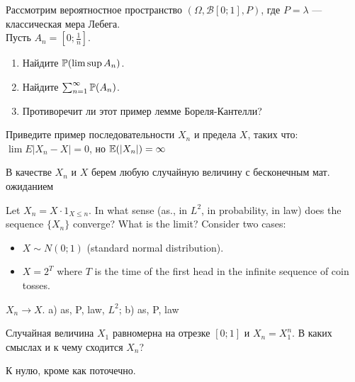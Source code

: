 \begin{problem}
Рассмотрим вероятностное пространство
$(\Omega,\mathcal{B}[0;1],P)$, где $P=\lambda$ — классическая
мера Лебега.\\
Пусть $A_{n}=[0;\frac{1}{n}]$.
\begin{enumerate}
\item Найдите $\P(\limsup A_{n})$.
\item Найдите $\sum_{n=1}^{\infty}\P(A_{n})$.
\item Противоречит ли этот пример лемме Бореля-Кантелли?
\end{enumerate}

\begin{sol}

\end{sol}
\end{problem}

\begin{problem}
Приведите пример последовательности $X_{n}$ и предела $X$, таких что: $\lim E|X_{n}-X|=0$, но $\E(|X_{n}|)=\infty$

\begin{sol}
 В качестве $X_{n}$ и $ X $ берем любую случайную величину с бесконечным мат. ожиданием
\end{sol}
\end{problem}

\begin{problem}
Let $X_{n}=X\cdot 1_{X\leq n}$. In what sense (as., in $L^{2}$, in probability, in law) does the sequence $ \{X_{n}\} $ converge? What is the limit? Consider two cases:
\begin{itemize}
\item $X\sim N(0;1)$ (standard normal distribution).
\item $X =2^{T}$ where $T$ is the time of the first head in the infinite sequence of coin tosses.
\end{itemize}


\begin{sol}
 $ X_{n}\to X $. a) as, P, law, $ L^{2} $; b) as, P, law
\end{sol}
\end{problem}

\begin{problem}
Случайная величина $X_1$ равномерна на отрезке $[0;1]$ и $X_n=X_1^n$. В каких смыслах и к чему сходится $X_n$?

\begin{sol}
К нулю, кроме как поточечно.
\end{sol}
\end{problem}

